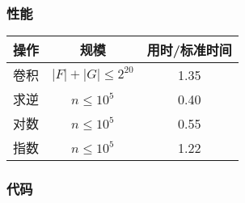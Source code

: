 \subsubsection{性能}

\begin{tabular}{|c|c|c|}
\hline
操作 & 规模 & 用时/标准时间 \\
\hline
卷积 & $|F| + |G| \le 2^{20}$ & 1.35 \\
\hline
求逆 & $n \le 10^5$ & 0.40 \\
\hline
对数 & $n \le 10^5$ & 0.55 \\
\hline
指数 & $n \le 10^5$ & 1.22 \\
\hline
\end{tabular}

\newpage

\subsubsection{代码}


